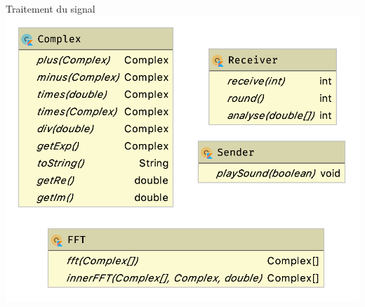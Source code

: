 \documentclass[aspectratio=169]{beamer}
\begin{document}
\begin{frame}{Traitement du signal}
  \centering
  \includegraphics[height=.9\textheight]{../assets/uml_signal}
\end{frame}
\end{document}
